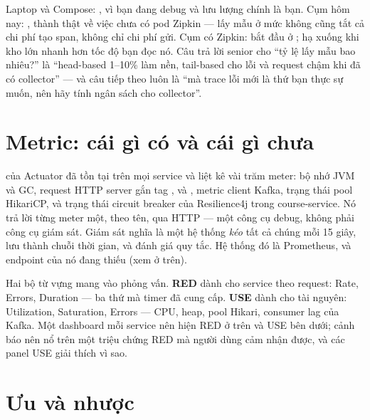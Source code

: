 \begin{decision}
Laptop và Compose: , vì bạn đang debug và lưu lượng chính là
bạn. Cụm hôm nay: , thành thật về việc chưa có pod Zipkin ---
lấy mẫu ở mức không cũng tắt cả chi phí tạo span, không chỉ chi phí
gửi. Cụm có Zipkin: bắt đầu ở ; hạ xuống  khi kho
lớn nhanh hơn tốc độ bạn đọc nó. Câu trả lời senior cho ``tỷ lệ lấy mẫu
bao nhiêu?'' là ``head-based 1--10\% làm nền, tail-based cho lỗi và
request chậm khi đã có collector'' --- và câu tiếp theo luôn là ``mà
trace lỗi mới là thứ bạn thực sự muốn, nên hãy tính ngân sách cho
collector''.
\end{decision}

\section{Metric: cái gì có và cái gì chưa}

 của Actuator đã tồn tại trên mọi service và
liệt kê vài trăm meter: bộ nhớ JVM và GC, request HTTP server gắn tag
,  và , metric client Kafka, trạng
thái pool HikariCP, và trạng thái circuit breaker của Resilience4j
trong course-service. Nó trả lời từng meter một, theo tên, qua HTTP ---
một công cụ debug, không phải công cụ giám sát. Giám sát nghĩa là một
hệ thống \emph{kéo} tất cả chúng mỗi 15 giây, lưu thành chuỗi thời
gian, và đánh giá quy tắc. Hệ thống đó là Prometheus, và endpoint của
nó đang thiếu (xem  ở trên).

Hai bộ từ vựng mang vào phỏng vấn. \textbf{RED} dành cho service theo
request: Rate, Errors, Duration --- ba thứ mà timer
 đã cung cấp. \textbf{USE} dành cho tài
nguyên: Utilization, Saturation, Errors --- CPU, heap, pool Hikari,
consumer lag của Kafka. Một dashboard mỗi service nên hiện RED ở trên
và USE bên dưới; cảnh báo nên nổ trên một triệu chứng RED mà người
dùng cảm nhận được, và các panel USE giải thích vì sao.

\section{Ưu và nhược}

